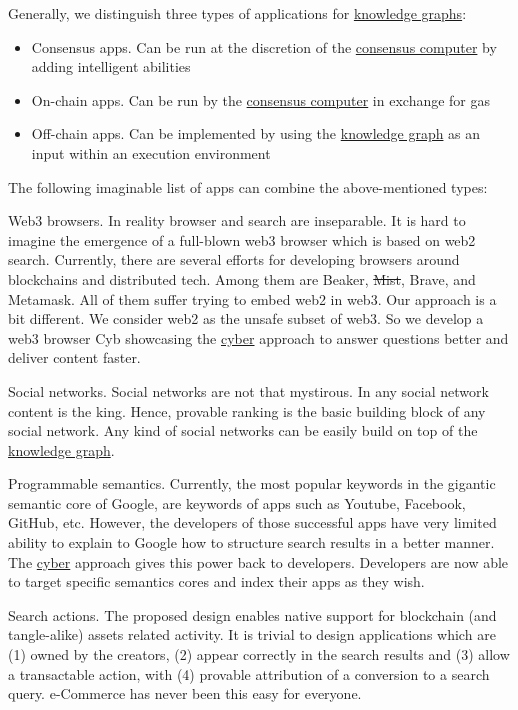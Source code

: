 \documentclass[8pt,oneside]{amsart}
\begin{document}
Generally, we distinguish three types of applications for {\hyperref[knowledge-graph]{knowledge graphs}}:

\begin{itemize}
\item Consensus apps. Can be run at the discretion of the {\hyperref[consensus-computer]{consensus computer}} by adding intelligent abilities
\item On-chain apps. Can be run by the {\hyperref[consensus-computer]{consensus computer}} in exchange for gas
\item Off-chain apps. Can be implemented by using the {\hyperref[knowledge-graph]{knowledge graph}} as an input within an execution environment
\end{itemize}

The following imaginable list of apps can combine the above-mentioned types:

Web3 browsers. In reality browser and search are inseparable. It is hard to imagine the emergence of a full-blown web3 browser which is based on web2 search. Currently, there are several efforts for developing browsers around blockchains and distributed tech. Among them are Beaker, \sout{Mist}, Brave, and Metamask. All of them suffer trying to embed web2 in web3. Our approach is a bit different. We consider web2 as the unsafe subset of web3. So we develop a web3 browser Cyb showcasing the {\hyperref[cyber]{cyber}} approach to answer questions better and deliver content faster.

Social networks. Social networks are not that mystirous. In any social network content is the king. Hence, provable ranking is the basic building block of any social network. Any kind of social networks can be easily build on top of the {\hyperref[knowledge-graph]{knowledge graph}}.

Programmable semantics. Currently, the most popular keywords in the gigantic semantic core of Google, are keywords of apps such as Youtube, Facebook, GitHub, etc. However, the developers of those successful apps have very limited ability to explain to Google how to structure search results in a better manner. The {\hyperref[cyber]{cyber}} approach gives this power back to developers. Developers are now able to target specific semantics cores and index their apps as they wish.

Search actions. The proposed design enables native support for blockchain (and tangle-alike) assets related activity. It is trivial to design applications which are (1) owned by the creators, (2) appear correctly in the search results and (3) allow a transactable action, with (4) provable attribution of a conversion to a search query. e-Commerce has never been this easy for everyone.
\end{document}
